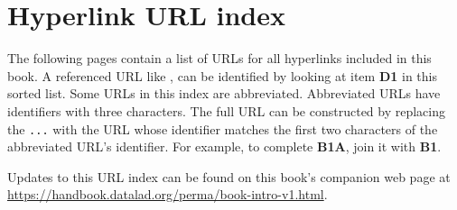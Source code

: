\titlespacing*{\chapter}{0pt}{0pt}{40pt}
\chapter*{Hyperlink URL index}

The following pages contain a list of URLs for all hyperlinks included in this
book.  A referenced URL like , can be identified by
looking at item \textbf{D1} in this sorted list. Some URLs in this index are
abbreviated.  Abbreviated URLs have identifiers with three characters. The full
URL can be constructed by replacing the \texttt{...} with the URL whose
identifier matches the first two characters of the abbreviated URL's
identifier.  For example, to complete \textbf{B1A}, join it with \textbf{B1}.

Updates to this URL index can be found on this book's companion web page at\\
\url{https://handbook.datalad.org/perma/book-intro-v1.html}.

\begin{description}
\setlength{\itemsep}{-2mm}
\setlength{\itemindent}{-8.5mm}

\end{description}
